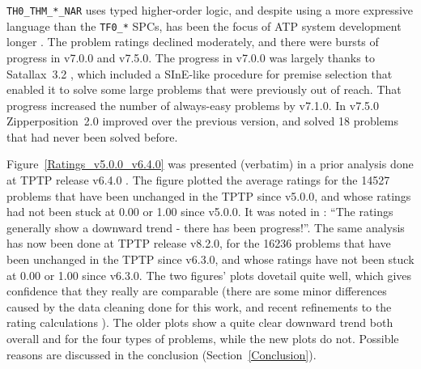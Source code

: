 \documentclass[runningheads]{llncs}
\begin{document}
{\tt TH0\_THM\_*\_NAR} uses typed higher-order logic, and despite using a more expressive
language than the {\tt TF0\_*} SPCs, has been the focus of ATP system development longer 
\cite{SB10,SS+12}.
The problem ratings declined moderately, and there were bursts of progress in v7.0.0 and v7.5.0.
The progress in v7.0.0 was largely thanks to Satallax~3.2 \cite{Bro12}, which included a SInE-like 
\cite{HV11} procedure for premise selection that enabled it to solve some large problems that 
were previously out of reach. 
That progress increased the number of always-easy problems by v7.1.0.
In v7.5.0 Zipperposition~2.0 \cite{BB+19-CADE} improved over the previous version, and solved
18 problems that had never been solved before.

Figure~\ref{Ratings_v5.0.0_v6.4.0} was presented (verbatim) in a prior analysis done at TPTP 
release v6.4.0 \cite{Sut17}.
The figure plotted the average ratings for the 14527 problems that have been unchanged in the 
TPTP since v5.0.0, and whose ratings had not been stuck at 0.00 or 1.00 since v5.0.0. 
It was noted in \cite{Sut17}: 
``The ratings generally show a downward trend - there has been progress!''.
The same analysis has now been done at TPTP release v8.2.0, for the 16236 problems that have been 
unchanged in the TPTP since v6.3.0, and whose ratings have not been stuck at 0.00 or 1.00 since 
v6.3.0.
The two figures' plots dovetail quite well, which gives confidence that they really are comparable
(there are some minor differences caused by the data cleaning done for this work, and recent 
refinements to the rating calculations \cite{SD23-CASC,SD24-CASC}).
The older plots show a quite clear downward trend both overall and for the four types of problems,
while the new plots do not.
Possible reasons are discussed in the conclusion (Section~\ref{Conclusion}).
\end{document}
